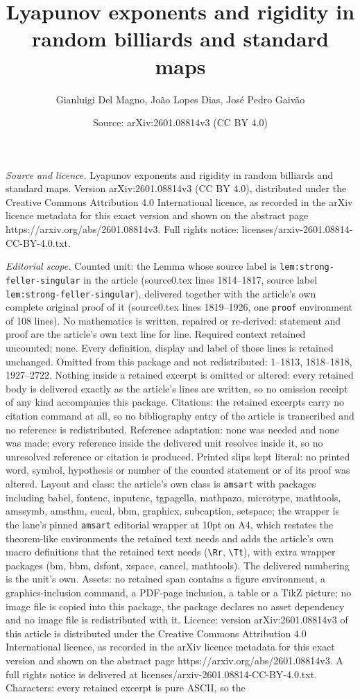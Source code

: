 \documentclass[10pt,a4paper]{amsart}
\title[Lyapunov exponents and rigidity in random billiards and stan]{Lyapunov exponents and rigidity in random billiards and standard maps}
\author{Gianluigi Del Magno, Jo\~ao Lopes Dias, Jos\'e Pedro Gaiv\~ao}
\date{Source: arXiv:2601.08814v3 (CC BY 4.0)}
\begin{document}
\maketitle

\noindent\emph{Source and licence.} Lyapunov exponents and rigidity in random billiards and standard maps. Version arXiv:2601.08814v3 (CC BY 4.0), distributed under the Creative Commons Attribution 4.0 International licence, as recorded in the arXiv licence metadata for this exact version and shown on the abstract page https://arxiv.org/abs/2601.08814v3. Full rights notice: licenses/arxiv-2601.08814-CC-BY-4.0.txt.\par\smallskip

\noindent\textit{Editorial scope.} Counted unit: the Lemma whose source label is \texttt{lem:strong-feller-singular} in the article (source0.tex lines 1814--1817, source label \texttt{lem:strong-feller-singular}), delivered together with the article's own complete original proof of it (source0.tex lines 1819--1926, one \texttt{proof} environment of 108 lines). No mathematics is written, repaired or re-derived: statement and proof are the article's own text line for line. Required context retained uncounted: none. Every definition, display and label of those lines is retained unchanged. Omitted from this package and not redistributed: 1--1813, 1818--1818, 1927--2722. Nothing inside a retained excerpt is omitted or altered: every retained body is delivered exactly as the article's lines are written, so no omission receipt of any kind accompanies this package. Citations: the retained excerpts carry no citation command at all, so no bibliography entry of the article is transcribed and no reference is redistributed. Reference adaptation: none was needed and none was made; every reference inside the delivered unit resolves inside it, so no unresolved reference or citation is produced. Printed slips kept literal: no printed word, symbol, hypothesis or number of the counted statement or of its proof was altered. Layout and class: the article's own class is \texttt{amsart} with packages including babel, fontenc, inputenc, tgpagella, mathpazo, microtype, mathtools, amssymb, amsthm, eucal, bbm, graphicx, subcaption, setspace; the wrapper is the lane's pinned \texttt{amsart} editorial wrapper at 10pt on A4, which restates the theorem-like environments the retained text needs and adds the article's own macro definitions that the retained text needs (\texttt{\textbackslash Rr}, \texttt{\textbackslash Tt}), with extra wrapper packages (bm, bbm, dsfont, xspace, cancel, mathtools). The delivered numbering is the unit's own. Assets: no retained span contains a figure environment, a graphics-inclusion command, a PDF-page inclusion, a table or a TikZ picture; no image file is copied into this package, the package declares no asset dependency and no image file is redistributed with it. Licence: version arXiv:2601.08814v3 of this article is distributed under the Creative Commons Attribution 4.0 International licence, as recorded in the arXiv licence metadata for this exact version and shown on the abstract page https://arxiv.org/abs/2601.08814v3. A full rights notice is delivered at licenses/arxiv-2601.08814-CC-BY-4.0.txt. Characters: every retained excerpt is pure ASCII, so the 
\end{document}

